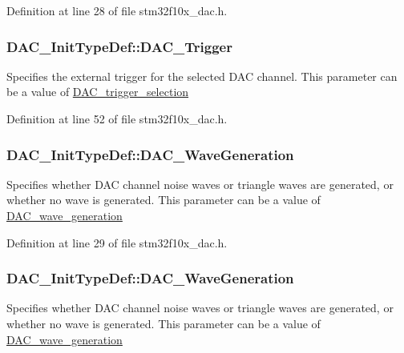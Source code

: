 Definition at line 28 of file stm32f10x\+\_\+dac.\+h.

\subsubsection[{\texorpdfstring{D\+A\+C\+\_\+\+Trigger}{DAC_Trigger}}]{ D\+A\+C\+\_\+\+Init\+Type\+Def\+::\+D\+A\+C\+\_\+\+Trigger}\hypertarget{struct_d_a_c___init_type_def_a7b26ebaeb51a0157a781f7de8ba779e5}{}\label{struct_d_a_c___init_type_def_a7b26ebaeb51a0157a781f7de8ba779e5}
Specifies the external trigger for the selected D\+AC channel. This parameter can be a value of \hyperlink{group___d_a_c__trigger__selection}{D\+A\+C\+\_\+trigger\+\_\+selection} 

Definition at line 52 of file stm32f10x\+\_\+dac.\+h.

\subsubsection[{\texorpdfstring{D\+A\+C\+\_\+\+Wave\+Generation}{DAC_WaveGeneration}}]{ D\+A\+C\+\_\+\+Init\+Type\+Def\+::\+D\+A\+C\+\_\+\+Wave\+Generation}\hypertarget{struct_d_a_c___init_type_def_ab0d24eb6e14decf7e5df35412dcc028a}{}\label{struct_d_a_c___init_type_def_ab0d24eb6e14decf7e5df35412dcc028a}
Specifies whether D\+AC channel noise waves or triangle waves are generated, or whether no wave is generated. This parameter can be a value of \hyperlink{group___d_a_c__wave__generation}{D\+A\+C\+\_\+wave\+\_\+generation} 

Definition at line 29 of file stm32f10x\+\_\+dac.\+h.

\subsubsection[{\texorpdfstring{D\+A\+C\+\_\+\+Wave\+Generation}{DAC_WaveGeneration}}]{ D\+A\+C\+\_\+\+Init\+Type\+Def\+::\+D\+A\+C\+\_\+\+Wave\+Generation}\hypertarget{struct_d_a_c___init_type_def_a6753e78ddd2dc8273444ba01a272d63a}{}\label{struct_d_a_c___init_type_def_a6753e78ddd2dc8273444ba01a272d63a}
Specifies whether D\+AC channel noise waves or triangle waves are generated, or whether no wave is generated. This parameter can be a value of \hyperlink{group___d_a_c__wave__generation}{D\+A\+C\+\_\+wave\+\_\+generation} 

